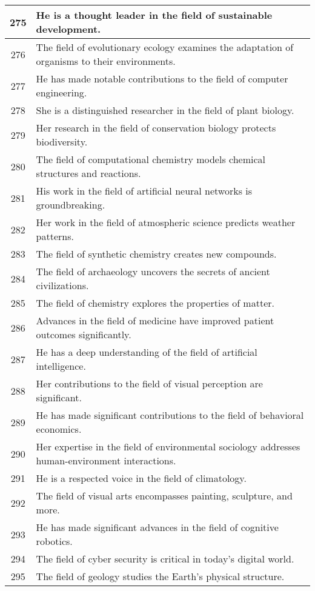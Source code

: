 \begin{longtable}{|c|p{12cm}|}
275 & He is a thought leader in the field of sustainable development. \\ \hline
276 & The field of evolutionary ecology examines the adaptation of organisms to their environments. \\ \hline
277 & He has made notable contributions to the field of computer engineering. \\ \hline
278 & She is a distinguished researcher in the field of plant biology. \\ \hline
279 & Her research in the field of conservation biology protects biodiversity. \\ \hline
280 & The field of computational chemistry models chemical structures and reactions. \\ \hline
281 & His work in the field of artificial neural networks is groundbreaking. \\ \hline
282 & Her work in the field of atmospheric science predicts weather patterns. \\ \hline
283 & The field of synthetic chemistry creates new compounds. \\ \hline
284 & The field of archaeology uncovers the secrets of ancient civilizations. \\ \hline
285 & The field of chemistry explores the properties of matter. \\ \hline
286 & Advances in the field of medicine have improved patient outcomes significantly. \\ \hline
287 & He has a deep understanding of the field of artificial intelligence. \\ \hline
288 & Her contributions to the field of visual perception are significant. \\ \hline
289 & He has made significant contributions to the field of behavioral economics. \\ \hline
290 & Her expertise in the field of environmental sociology addresses human-environment interactions. \\ \hline
291 & He is a respected voice in the field of climatology. \\ \hline
292 & The field of visual arts encompasses painting, sculpture, and more. \\ \hline
293 & He has made significant advances in the field of cognitive robotics. \\ \hline
294 & The field of cyber security is critical in today's digital world. \\ \hline
295 & The field of geology studies the Earth's physical structure. \\ \hline

\end{longtable}

